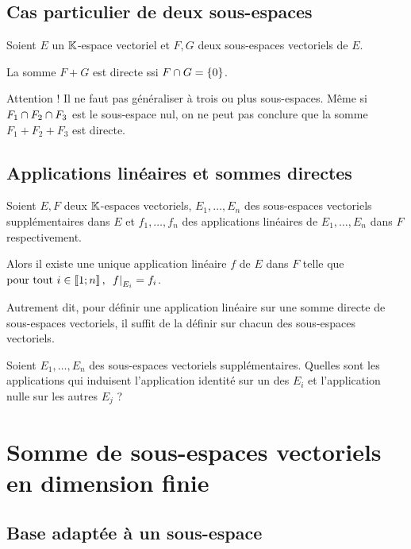 \subsection{Cas particulier de deux sous-espaces}

\begin{prop}
Soient \(E\) un \(\mathbb{K}\)-espace vectoriel et \(F,G\) deux sous-espaces vectoriels de \(E\).

La somme \(F+G\) est directe ssi \(F\cap G=\left\lbrace0\right\rbrace\).
\end{prop}

Attention ! Il ne faut pas généraliser à trois ou plus sous-espaces. Même si \(F_1\cap F_2\cap F_3\) est le sous-espace nul, on ne peut pas conclure que la somme \(F_1+F_2+F_3\) est directe.

\subsection{Applications linéaires et sommes directes}

\begin{prop}
Soient \(E,F\) deux \(\mathbb{K}\)-espaces vectoriels, \(E_1,\dots,E_n\) des sous-espaces vectoriels supplémentaires dans \(E\) et \(f_1,\dots,f_n\) des applications linéaires de \(E_1,\dots,E_n\) dans \(F\) respectivement.

Alors il existe une unique application linéaire \(f\) de \(E\) dans \(F\) telle que \(\quantifs{\tpt i\in\interventierii{1}{n}}\restr{f}{E_i}=f_i\).
\end{prop}

Autrement dit, pour définir une application linéaire sur une somme directe de sous-espaces vectoriels, il suffit de la définir sur chacun des sous-espaces vectoriels.

\begin{exo}
Soient \(E_1,\dots,E_n\) des sous-espaces vectoriels supplémentaires. Quelles sont les applications qui induisent l'application identité sur un des \(E_i\) et l'application nulle sur les autres \(E_j\) ?
\end{exo}

\section{Somme de sous-espaces vectoriels en dimension finie}

\subsection{Base adaptée à un sous-espace}

